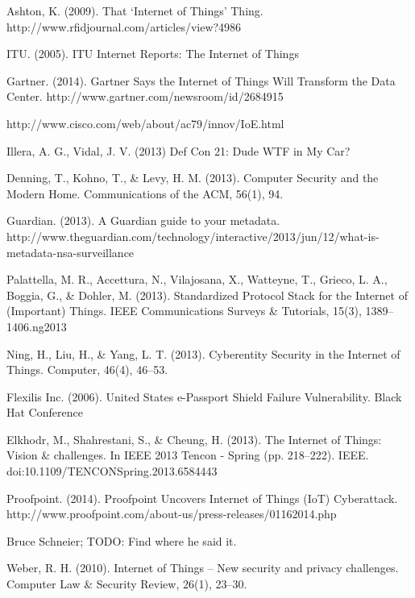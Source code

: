 \documentclass[10pt,journal,compsoc]{IEEEtran}
\begin{document}
\begin{thebibliography}{1}

Ashton, K. (2009). That `Internet of Things' Thing. http://www.rfidjournal.com/articles/view?4986

ITU. (2005). ITU Internet Reports: The Internet of Things

Gartner. (2014). Gartner Says the Internet of Things Will Transform the Data Center. http://www.gartner.com/newsroom/id/2684915

http://www.cisco.com/web/about/ac79/innov/IoE.html

Illera, A. G., Vidal, J. V. (2013) Def Con 21: Dude WTF in My Car?  

Denning, T., Kohno, T., \& Levy, H. M. (2013). Computer Security and the Modern Home. Communications of the ACM, 56(1), 94. 

Guardian. (2013). A Guardian guide to your metadata. http://www.theguardian.com/technology/interactive/2013/jun/12/what-is-metadata-nsa-surveillance

Palattella, M. R., Accettura, N., Vilajosana, X., Watteyne, T., Grieco, L. A., Boggia, G., \& Dohler, M. (2013). Standardized Protocol Stack for the Internet of (Important) Things. IEEE Communications Surveys \& Tutorials, 15(3), 1389–1406.ng2013 

Ning, H., Liu, H., \& Yang, L. T. (2013). Cyberentity Security in the Internet of Things. Computer, 46(4), 46–53. 

Flexilis Inc. (2006). United States e-Passport Shield Failure Vulnerability. Black Hat Conference

Elkhodr, M., Shahrestani, S., \& Cheung, H. (2013). The Internet of Things: Vision \& challenges. In IEEE 2013 Tencon - Spring (pp. 218–222). IEEE. doi:10.1109/TENCONSpring.2013.6584443

Proofpoint. (2014). Proofpoint Uncovers Internet of Things (IoT) Cyberattack. http://www.proofpoint.com/about-us/press-releases/01162014.php

Bruce Schneier; TODO: Find where he said it.

Weber, R. H. (2010). Internet of Things – New security and privacy challenges. Computer Law \& Security Review, 26(1), 23–30. 


\end{thebibliography}
\end{document}
